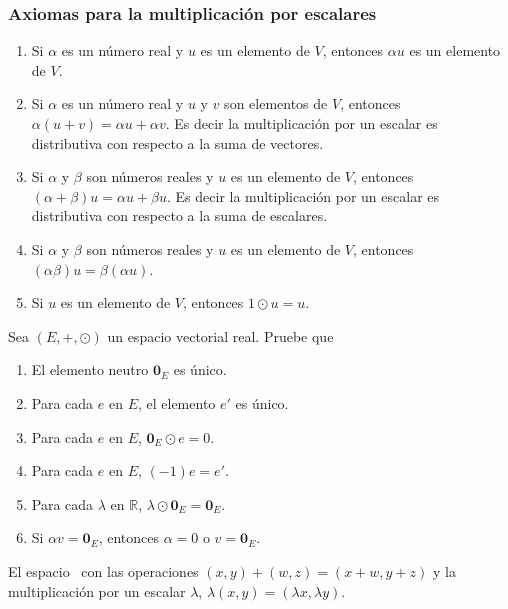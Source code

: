 \subsubsection*{Axiomas para la multiplicación por escalares}
\begin{enumerate}
\item Si $\alpha$ es un número real y $u$ es un elemento de $V$, entonces $\alpha u$ es un elemento de $V$.
\item Si $\alpha$ es un número real y $u$ y $v$ son elementos de $V$, entonces $\alpha (u+v) = \alpha u + \alpha v$. Es decir la multiplicación por un escalar es distributiva con respecto a la suma de vectores.
\item Si $\alpha$ y $\beta$ son números reales y $u$ es un elemento de $V$, entonces $(\alpha + \beta)u = \alpha u + \beta u$. Es decir la multiplicación por un escalar es distributiva con respecto a la suma de escalares.
\item Si $\alpha$ y $\beta$ son números reales y $u$ es un elemento de $V$, entonces $(\alpha \beta)u = \beta(\alpha u)$.
\item Si $u$ es un elemento de $V$, entonces $1 \odot u = u$.

\end{enumerate}

\begin{trabajoautonomo}
Sea $(E, +, \odot)$ un espacio vectorial real. Pruebe que
\begin{enumerate}
\item El elemento neutro $\mathbf{0}_E$ es único.
\item Para cada $e$ en $E$, el elemento $e'$ es único.
\item Para cada $e$ en $E$, $\mathbf{0}_E \odot e = 0$.
\item Para cada $e$ en $E$, $(-1)e = e'$.
\item Para cada $\lambda$ en $\mathbb{R}$, $\lambda \odot \mathbf{0}_E = \mathbf{0}_E$.
\item Si $\alpha v = \mathbf{0}_E$, entonces $\alpha = 0$ o $v=\mathbf{0}_E$.

\end{enumerate}
\end{trabajoautonomo}
\begin{ejemplo}

El espacio \rdos \ con las operaciones $(x,y)+(w,z) = (x+w,y+z)$ y la multiplicación por un escalar $\lambda$, $\lambda (x,y) = (\lambda x,\lambda y)$.

\end{ejemplo}

